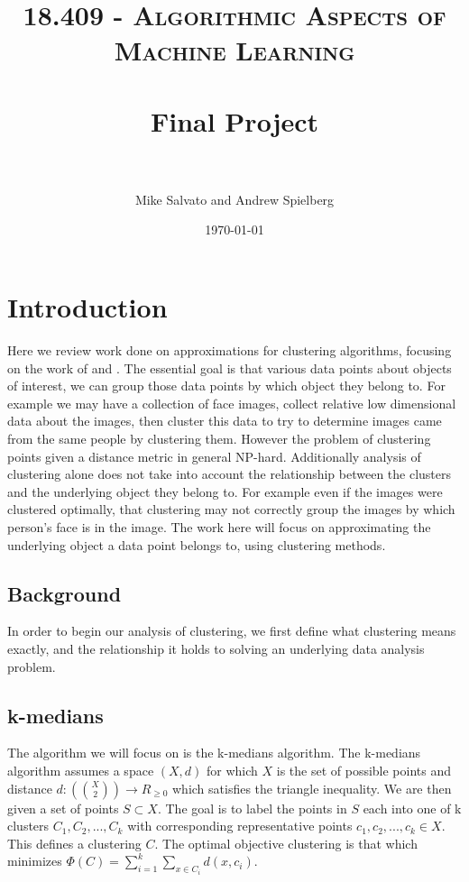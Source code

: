 \documentclass[paper=a4, fontsize=11pt]{scrartcl} %
\title{	
\normalfont \normalsize 
\textsc{18.409 - Algorithmic Aspects of Machine Learning} \\ [25pt] %
\horrule{0.5pt} \\[0.4cm] %
\huge Final Project \\ %
\horrule{2pt} \\[0.5cm] %
}
\author{Mike Salvato and Andrew Spielberg} %
\date{\normalsize\today} %
\numberwithin{equation}{section} %
\numberwithin{figure}{section} %
\numberwithin{table}{section} %
\begin{document}
\maketitle %

\section{Introduction}

Here we review work done on approximations for clustering algorithms, focusing on the work of \cite{firstpaper} and \cite{secondpaper}. The essential goal is that various data points about objects of interest, we can group those data points by which object they belong to. For example we may have a collection of face images, collect relative low dimensional data about the images, then cluster this data to try to determine images came from the same people by clustering them. However the problem of clustering points given a distance metric in general NP-hard. Additionally analysis of clustering alone does not take into account the relationship between the clusters and the underlying object they belong to. For example even if the images were clustered optimally, that clustering may not correctly group the images by which person's face is in the image. The work here will focus on approximating the underlying object a data point belongs to, using clustering methods.

\subsection{Background}

In order to begin our analysis of clustering, we first define what clustering means exactly, and the relationship it holds to solving an underlying data analysis problem. 

\subsection{k-medians}
The algorithm we will focus on is the k-medians algorithm. The k-medians algorithm assumes a space $(X, d)$ for which $X$ is the set of possible points and distance $d : ({ X \choose 2}) \rightarrow R_{\geq 0}$ which satisfies the triangle inequality. We are then given a set of points $S \subset X$. The goal is to label the points in $S$ each into one of k clusters $C_1, C_2, ..., C_k$ with corresponding representative points $c_1, c_2, ..., c_k \in X$. This defines a clustering $C$. The optimal objective clustering is that which minimizes $\Phi(C) = \sum\limits_{i = 1}^k \sum_{x \in C_i} d(x, c_i)$.
\end{document}
